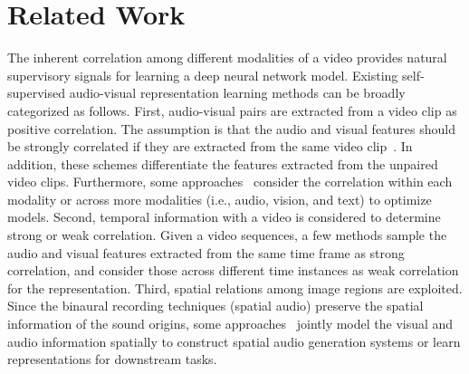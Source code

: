 \section{Related Work}
%
The inherent correlation among different modalities of a video provides natural supervisory signals for learning a deep neural network model.
%
Existing self-supervised audio-visual representation learning methods
can be broadly categorized as follows. 
First, audio-visual pairs are extracted from a video clip as positive correlation. 
%
The assumption is that the audio and visual features should be strongly correlated if they are extracted from the same video clip~\cite{av_iccv17_look,av_eccv18_obj_that_sound,av_nips16_soundnet,av_eccv16_abSound}. 
%
%
In addition, these schemes differentiate the features extracted from the unpaired video clips.
Furthermore, some approaches~\cite{av_arxiv_agreement,avt_nips20_VersatileNet} consider the correlation within each modality or across more modalities (i.e., audio, vision, and text) to optimize models.
% 
Second, temporal information with a video is considered to determine strong or weak correlation. 
%
Given a video sequences, a few methods sample the audio and visual features extracted from the same time frame as strong correlation, and consider those across different time instances as weak correlation for the representation.
%
Third, spatial relations among image regions are exploited. 
%
Since the binaural recording techniques (spatial audio) preserve the spatial information of the sound origins, some approaches~\cite{av_nips20_spatial_alignment,av_eccv20_sep-stereo,av_cvpr20_tell_left_right,25d,360gen} jointly model the visual and audio information spatially to construct spatial audio generation systems or learn representations for downstream tasks.
%


